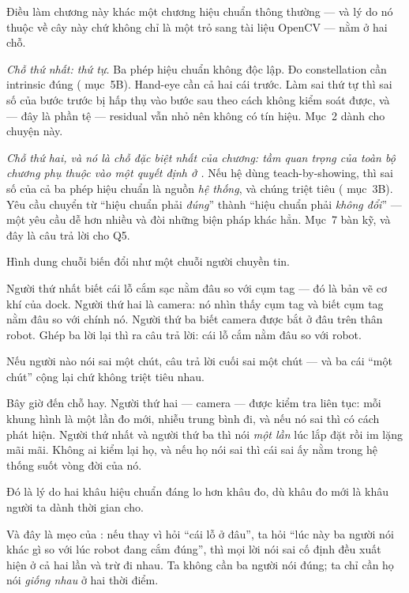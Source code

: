 \documentclass[../../marker.tex]{subfiles}
\begin{document}
Điều làm chương này khác một chương hiệu chuẩn thông thường --- và lý do nó thuộc về cây này chứ không chỉ là một trỏ sang tài liệu OpenCV --- nằm ở hai chỗ.

\emph{Chỗ thứ nhất: thứ tự.} Ba phép hiệu chuẩn không độc lập. Đo constellation cần intrinsic đúng ( mục~5B). Hand-eye cần cả hai cái trước. Làm sai thứ tự thì sai số của bước trước bị hấp thụ vào bước sau theo cách không kiểm soát được, và --- đây là phần tệ --- residual vẫn nhỏ nên không có tín hiệu. Mục~2 dành cho chuyện này.

\emph{Chỗ thứ hai, và nó là chỗ đặc biệt nhất của chương: tầm quan trọng của toàn bộ chương phụ thuộc vào một quyết định ở .} Nếu hệ dùng teach-by-showing, thì sai số của cả ba phép hiệu chuẩn là nguồn \emph{hệ thống}, và chúng triệt tiêu ( mục~3B). Yêu cầu chuyển từ ``hiệu chuẩn phải \emph{đúng}'' thành ``hiệu chuẩn phải \emph{không đổi}'' --- một yêu cầu dễ hơn nhiều và đòi những biện pháp khác hẳn. Mục~7 bàn kỹ, và đây là câu trả lời cho Q5.

\begin{trucgiac}
Hình dung chuỗi biến đổi như một chuỗi người chuyền tin.

Người thứ nhất biết cái lỗ cắm sạc nằm đâu so với cụm tag --- đó là bản vẽ cơ khí của dock. Người thứ hai là camera: nó nhìn thấy cụm tag và biết cụm tag nằm đâu so với chính nó. Người thứ ba biết camera được bắt ở đâu trên thân robot. Ghép ba lời lại thì ra câu trả lời: cái lỗ cắm nằm đâu so với robot.

Nếu người nào nói sai một chút, câu trả lời cuối sai một chút --- và ba cái ``một chút'' cộng lại chứ không triệt tiêu nhau.

Bây giờ đến chỗ hay. Người thứ hai --- camera --- được kiểm tra liên tục: mỗi khung hình là một lần đo mới, nhiễu trung bình đi, và nếu nó sai thì có cách phát hiện. Người thứ nhất và người thứ ba thì nói \emph{một lần} lúc lắp đặt rồi im lặng mãi mãi. Không ai kiểm lại họ, và nếu họ nói sai thì cái sai ấy nằm trong hệ thống suốt vòng đời của nó.

Đó là lý do hai khâu hiệu chuẩn đáng lo hơn khâu đo, dù khâu đo mới là khâu người ta dành thời gian cho.

Và đây là mẹo của : nếu thay vì hỏi ``cái lỗ ở đâu'', ta hỏi ``lúc này ba người nói khác gì so với lúc robot đang cắm đúng'', thì mọi lời nói sai cố định đều xuất hiện ở cả hai lần và trừ đi nhau. Ta không cần ba người nói đúng; ta chỉ cần họ nói \emph{giống nhau} ở hai thời điểm.
\end{trucgiac}
\end{document}
